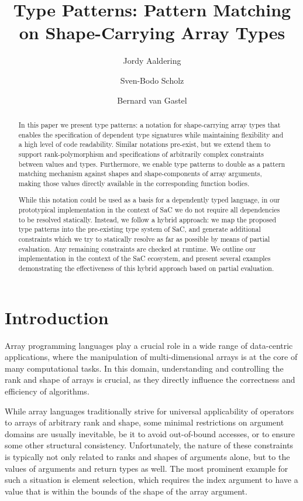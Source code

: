 \documentclass[sigconf,screen]{acmart}
\title{Type Patterns: Pattern Matching on Shape-Carrying Array Types}
\author{Jordy Aaldering}
\affiliation{%
  \institution{Radboud University}
  \city{Nijmegen}
  \country{Netherlands}}
\author{Sven-Bodo Scholz}
\affiliation{%
  \institution{Radboud University}
  \city{Nijmegen}
  \country{Netherlands}}
\author{Bernard van Gastel}
\affiliation{%
  \institution{Radboud University}
  \city{Nijmegen}
  \country{Netherlands}}
\begin{document}
\begin{abstract}
In this paper we present type patterns: a notation for shape-carrying array types that enables the specification of dependent type signatures while maintaining flexibility and a high level of code readability.
Similar notations pre-exist, but we extend them to support rank-polymorphism and specifications of arbitrarily complex constraints between values and types.
Furthermore, we enable type patterns to double as a pattern matching mechanism against shapes and shape-components of array arguments, making those values directly available in the corresponding function bodies.

While this notation could be used as a basis for a dependently typed language, in our prototypical implementation in the context of SaC we do not require all dependencies to be resolved statically.
Instead, we follow a hybrid approach: we map the proposed type patterns into the pre-existing type system of SaC, and generate additional constraints which we try to statically resolve as far as possible by means of partial evaluation.
Any remaining constraints are checked at runtime.
We outline our implementation in the context of the SaC ecosystem, and present several examples demonstrating the effectiveness of this hybrid approach based on partial evaluation.
\end{abstract}


\maketitle

\section{Introduction}
Array programming languages play a crucial role in a wide range of data-centric applications, where the manipulation of multi-dimen\-sional arrays is at the core of many computational tasks.
In this domain, understanding and controlling the rank and shape of arrays is crucial, as they directly influence the correctness and efficiency of algorithms.

While array languages traditionally strive for universal applicability of operators to arrays of arbitrary rank and shape, some minimal restrictions on argument domains are usually inevitable, be it to avoid out-of-bound accesses, or to ensure some other structural consistency.
Unfortunately, the nature of these constraints is typically not only related to ranks and shapes of arguments alone, but to the values of arguments and return types as well.
The most prominent example for such a situation is element selection, which requires the index argument to have a value that is within the bounds of the shape of the array argument.
\end{document}
